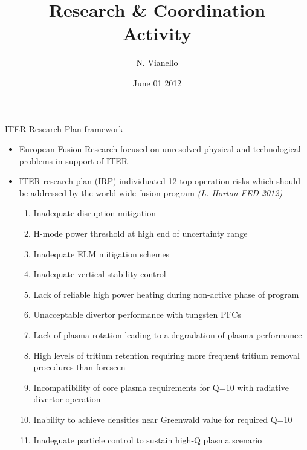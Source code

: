 \documentclass[t,10pt]{beamer}
\title{Research \& Coordination  \\
Activity}
\author{N. Vianello }
\date{ June 01 2012}
\begin{document}
\begin{titleframe}
\end{titleframe}

\begin{frame}{ITER Research Plan framework}
\begin{itemize}
\item European Fusion Research focused on unresolved physical and
technological problems in support of ITER
\item ITER research plan (IRP) individuated 12 top operation risks which 
should be addressed by the world-wide fusion program {\footnotesize
  \textit{(L. Horton FED 2012)}}
\begin{enumerate}
\item {} Inadequate disruption mitigation
\item {} H-mode power threshold at high end of
  uncertainty range
\item {} Inadequate ELM mitigation schemes
\item {} Inadequate vertical stability control
\item {}Lack of reliable high power heating during
  non-active phase of program
\item {} Unacceptable divertor performance with tungsten PFCs
\item {} Lack of plasma rotation leading to a
  degradation of plasma performance
\item {} High levels of tritium retention requiring more
  frequent tritium removal procedures than foreseen
\item {} Incompatibility of core plasma requirements for Q=10 with
  radiative divertor operation
\item {}Inability to achieve densities near
  Greenwald value for required Q=10
\item {} Inadeguate particle control to sustain
  high-Q plasma scenario
\end{enumerate}
\end{itemize}

\end{frame}
\end{document}
